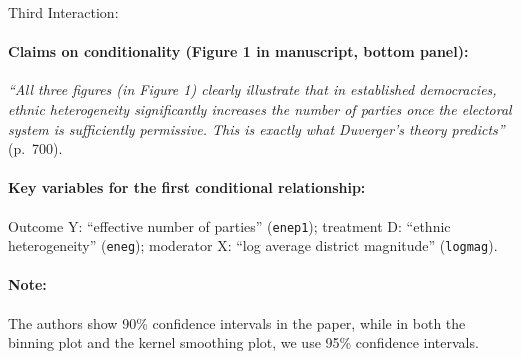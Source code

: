 \documentclass[12pt]{article}
\begin{document}
\noindent Third Interaction:

\paragraph{Claims on conditionality (Figure 1 in manuscript, bottom panel):} \emph{``All three
  figures (in Figure 1) clearly illustrate that in established democracies, ethnic
  heterogeneity significantly increases the number of parties once the
  electoral system is sufficiently permissive. This is exactly what
  Duverger’s theory predicts''} (p.\ 700).


\paragraph{Key variables for the first conditional relationship:} Outcome Y:
``effective number of parties'' 
(\texttt{enep1}); treatment D:  ``ethnic
heterogeneity'' (\texttt{eneg}); moderator X: ``log average district magnitude'' (\texttt{logmag}). 

\paragraph{Note:} The authors show 90\% confidence intervals in the paper, while in both the binning plot and the kernel smoothing plot, we use 95\% confidence intervals.
\end{document}
